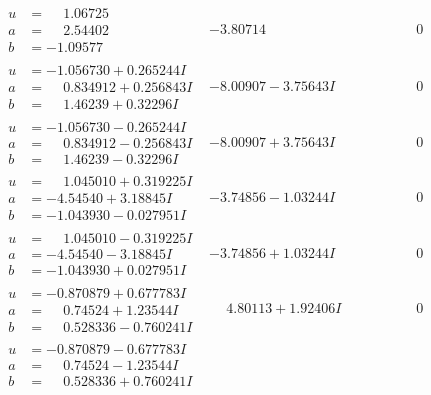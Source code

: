 \documentclass[1p]{elsarticle_modified}
\theoremstyle{definition}
\begin{document}
$$\begin{array}{c|c|c}
\begin{aligned}
u &= \phantom{-}1.06725\phantom{ +0.000000I} \\
a &= \phantom{-}2.54402\phantom{ +0.000000I} \\
b &= -1.09577\phantom{ +0.000000I}\end{aligned}
 & -3.80714\phantom{ +0.000000I} & \phantom{-0.000000 } 0 \\ \hline\begin{aligned}
u &= -1.056730 + 0.265244 I \\
a &= \phantom{-}0.834912 + 0.256843 I \\
b &= \phantom{-}1.46239 + 0.32296 I\end{aligned}
 & -8.00907 - 3.75643 I & \phantom{-0.000000 } 0 \\ \hline\begin{aligned}
u &= -1.056730 - 0.265244 I \\
a &= \phantom{-}0.834912 - 0.256843 I \\
b &= \phantom{-}1.46239 - 0.32296 I\end{aligned}
 & -8.00907 + 3.75643 I & \phantom{-0.000000 } 0 \\ \hline\begin{aligned}
u &= \phantom{-}1.045010 + 0.319225 I \\
a &= -4.54540 + 3.18845 I \\
b &= -1.043930 - 0.027951 I\end{aligned}
 & -3.74856 - 1.03244 I & \phantom{-0.000000 } 0 \\ \hline\begin{aligned}
u &= \phantom{-}1.045010 - 0.319225 I \\
a &= -4.54540 - 3.18845 I \\
b &= -1.043930 + 0.027951 I\end{aligned}
 & -3.74856 + 1.03244 I & \phantom{-0.000000 } 0 \\ \hline\begin{aligned}
u &= -0.870879 + 0.677783 I \\
a &= \phantom{-}0.74524 + 1.23544 I \\
b &= \phantom{-}0.528336 - 0.760241 I\end{aligned}
 & \phantom{-}4.80113 + 1.92406 I & \phantom{-0.000000 } 0 \\ \hline\begin{aligned}
u &= -0.870879 - 0.677783 I \\
a &= \phantom{-}0.74524 - 1.23544 I \\
b &= \phantom{-}0.528336 + 0.760241 I\end{aligned}

\end{array}$$
\end{document}
